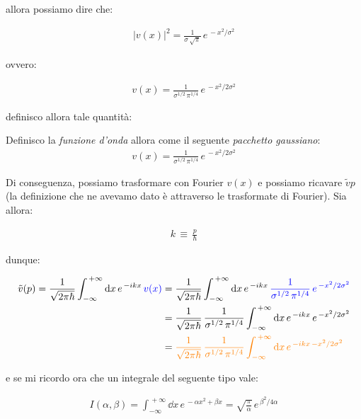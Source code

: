 	allora possiamo dire che:

\begin{align*}
	|v(x)|^2 =  \frac{1}{\sigma \, \sqrt{\pi}} \, e^{\, - x^2 / \sigma^2}
\end{align*}

	ovvero:
	
\begin{align*}
	v(x) = \frac{1}{\sigma^{1/2} \, \pi^{1/4}} \, e^{\, - x^2 / 2\sigma^2}
\end{align*}

	definisco allora tale quantità:
	
\begin{nb}
	Definisco la \textit{funzione d'onda} allora come il seguente \textit{pacchetto gaussiano}:
\begin{align*}
	v(x) = \frac{1}{\sigma^{1/2} \, \pi^{1/4}} \, e^{\, - x^2 / 2\sigma^2}
\end{align*}
\end{nb}

	Di conseguenza, possiamo trasformare con Fourier $v(x)$ e possiamo ricavare $\tilde{v}{p}$ (la definizione che ne avevamo dato è attraverso le trasformate di Fourier). Sia allora:
	
\begin{align*}
	k \, \equiv \, \frac{p}{\hbar}
\end{align*} 

	dunque:
	
\begin{align*}
	\tilde{v}(p) = \frac{1}{\sqrt{2\pi\hbar}} \int_{-\infty}^{\, + \infty} \dd x \, e^{\, - ikx} \, \textcolor{blue}{v(x)} & = \frac{1}{\sqrt{2\pi\hbar}} \int_{-\infty}^{\, + \infty} \dd x \, e^{\, - ikx} \, \textcolor{blue}{\frac{1}{\sigma^{1/2} \, \pi^{1/4}} \, e^{\, - x^2 / 2\sigma^2}} \\
	& = \frac{1}{\sqrt{2\pi\hbar}}  \, \frac{1}{\sigma^{1/2} \, \pi^{1/4}}\int_{-\infty}^{\, + \infty} \dd x \, e^{\, - ikx} \, e^{\, - x^2 / 2\sigma^2} \\
	& = \textcolor{orange}{\frac{1}{\sqrt{2\pi\hbar}}  \, \frac{1}{\sigma^{1/2} \, \pi^{1/4}}\int_{-\infty}^{\, + \infty} \dd x \, e^{\, - ikx \, - x^2 / 2\sigma^2}}
\end{align*}
	
	e se mi ricordo ora che un integrale del seguente tipo vale:

\begin{align*}
	I(\alpha, \beta) = \int_{-\infty}^{\, + \infty} \dd x \, e^{\, - \alpha x^2 + \beta{x}} = \sqrt{\frac{\pi}{\alpha}} \, e^{\,\beta^2/4\alpha}
\end{align*}
	
